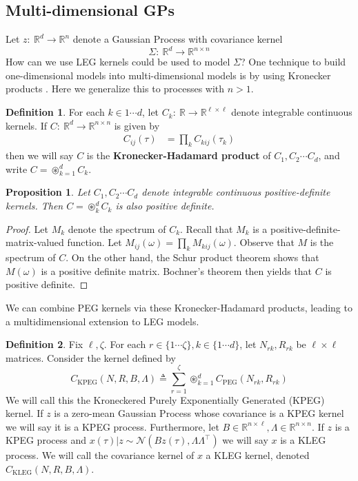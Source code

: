 \documentclass{article}
\newtheorem{prop}{Proposition}
\theoremstyle{definition}
\newtheorem{definition}{Definition}
\newcommand{\PEG}{\mathrm{PEG}}
\newcommand{\KPEG}{\mathrm{KPEG}}
\newcommand{\KLEG}{\mathrm{KLEG}}
\begin{document}
\subsection{Multi-dimensional GPs}

Let $z:\ \mathbb{R}^d \rightarrow \mathbb{R}^n$ denote a Gaussian Process with covariance kernel
\[
\Sigma:\ \mathbb{R}^d \rightarrow \mathbb{R}^{n \times n}
\]
How can we use LEG kernels could be used to model $\Sigma$?  One technique to build one-dimensional models into multi-dimensional models is by using Kronecker products \cite{tsiligkaridis2013covariance}.  Here we generalize this to processes with $n>1$.  

\begin{definition}
    For each $k\in {1\cdots d}$, let $C_k:\ \mathbb{R} \rightarrow \mathbb{R}^{\ell \times \ell}$ denote integrable continuous kernels.  If $C:\ \mathbb{R}^d \rightarrow \mathbb{R}^{n \times n}$ is given by
    \begin{align*}
    C_{ij}(\tau)&= \prod_k C_{kij}(\tau_k)
    \end{align*}
    then we will say $C$ is the \textbf{Kronecker-Hadamard product} of $C_1,C_2\cdots C_d$, and write $C = \circledast_{k=1}^d C_k$.
\end{definition}

\begin{prop}
    Let $C_1,C_2\cdots C_d$ denote integrable continuous positive-definite kernels.  Then $C=\circledast_k^d C_k$ is also positive definite. 
\end{prop}

\begin{proof}
Let $M_k$ denote the spectrum of $C_k$.  Recall that $M_k$ is a positive-definite-matrix-valued function.  Let $M_{ij}(\omega)=\prod_k M_{kij}(\omega)$.  Observe that $M$ is the spectrum of $C$.  On the other hand, the Schur product theorem shows that $M(\omega)$ is a positive definite matrix.  Bochner's theorem then yields that $C$ is positive definite.
\end{proof}

We can combine PEG kernels via these Kronecker-Hadamard products, leading to a multidimensional extension to LEG models.

\begin{definition}
    Fix $\ell,\zeta$.  For each $r \in \{1 \cdots \zeta\},k \in \{1 \cdots d\}$, let $N_{rk},R_{rk}$ be $\ell\times \ell$ matrices.  Consider the kernel defined by 
    \[
    C_\KPEG(N,R,B,\Lambda) \triangleq \sum_{r=1}^{\zeta} \circledast_{k=1}^d C_\PEG(N_{rk},R_{rk})
    \]
    We will call this the Kroneckered Purely Exponentially Generated (KPEG) kernel.  If $z$ is a zero-mean Gaussian Process whose covariance is a KPEG kernel we will say it is a KPEG process.  Furthermore, let $B\in \mathbb{R}^{n\times \ell},\Lambda \in \mathbb{R}^{n\times n}$.  If $z$ is a KPEG process and $x(\tau)|z \sim \mathcal{N}(Bz(\tau),\Lambda \Lambda^\top)$ we will say $x$ is a KLEG process.  We will call the covariance kernel of $x$ a KLEG kernel, denoted $C_\KLEG(N,R,B,\Lambda)$.
\end{definition}
\end{document}
